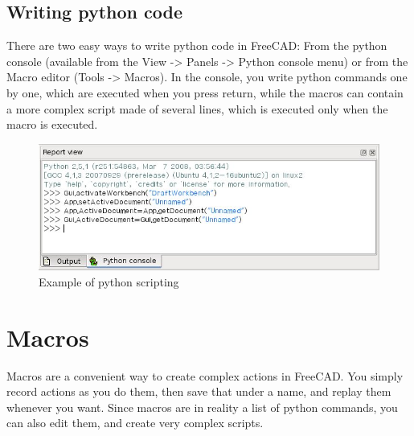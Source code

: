 \subsection{Writing python code}
There are two easy ways to write python code in FreeCAD: From the python 
console (available from the View -> Panels -> Python console menu) or from 
the Macro editor (Tools -> Macros). In the console, you write python commands 
one by one, which are executed when you press return, while the macros can 
contain a more complex script made of several lines, which is executed only 
when the macro is executed.
\begin{figure}[h!]                                                       
\begin{center}                                                          
\includegraphics[scale=0.5]{images/Screenshot_pythoninterpreter.jpg}                     
\caption{Example of python scripting}
\end{center}
\end{figure} 

\section{Macros}
Macros are a convenient way to create complex actions in FreeCAD. You simply 
record actions as you do them, then save that under a name, and replay them 
whenever you want. Since macros are in reality a list of python commands, 
you can also edit them, and create very complex scripts.

